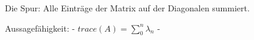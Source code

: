 Die Spur:
Alle Einträge der Matrix auf der Diagonalen summiert.

Aussagefähigkeit:
- $trace(A) = \sum_{0}^{n}{\lambda_{n}}$
- 